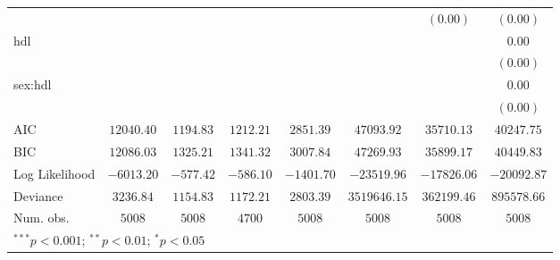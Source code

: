 \begin{tabular}{l c c c c c c c}
                     &               &               &              &               &              & $(0.00)$      & $(0.00)$      \\
hdl                  &               &               &              &               &              &               & $0.00$        \\
                     &               &               &              &               &              &               & $(0.00)$      \\
sex:hdl              &               &               &              &               &              &               & $0.00$        \\
                     &               &               &              &               &              &               & $(0.00)$      \\
\midrule
AIC                  & $12040.40$    & $1194.83$     & $1212.21$    & $2851.39$     & $47093.92$   & $35710.13$    & $40247.75$    \\
BIC                  & $12086.03$    & $1325.21$     & $1341.32$    & $3007.84$     & $47269.93$   & $35899.17$    & $40449.83$    \\
Log Likelihood       & $-6013.20$    & $-577.42$     & $-586.10$    & $-1401.70$    & $-23519.96$  & $-17826.06$   & $-20092.87$   \\
Deviance             & $3236.84$     & $1154.83$     & $1172.21$    & $2803.39$     & $3519646.15$ & $362199.46$   & $895578.66$   \\
Num. obs.            & $5008$        & $5008$        & $4700$       & $5008$        & $5008$       & $5008$        & $5008$        \\
\bottomrule
\multicolumn{8}{l}{\scriptsize{$^{***}p<0.001$; $^{**}p<0.01$; $^{*}p<0.05$}}
\end{tabular}
